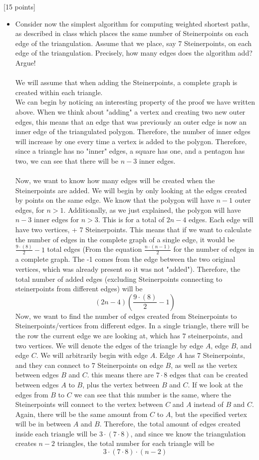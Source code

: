 \documentclass[12pt]{article}
\newcounter{ques}
\newenvironment{question}{\stepcounter{ques}{\noindent\bf Question \arabic{ques}:}}{\vspace{5mm}}
\begin{document}
\begin{question}[15 points]
\begin{itemize}
	\item Consider now the simplest algorithm for computing weighted shortest paths, as described in class which places the same number of Steinerpoints on each edge of the triangulation.   Assume that we place, say 7 Steinerpoints,  on each edge of the triangulation. Precisely, how many edges does the algorithm add? Argue!\\\\
  We will assume that when adding the Steinerpoints, a complete graph is created within each triangle.\\
  We can begin by noticing an interesting property of the proof we have written above. When we think about "adding" a vertex and creating two new outer edges, this means that an edge that was previously an outer edge is now an inner edge of the triangulated polygon. Therefore, the number of inner edges will increase by one every time a vertex is added to the polygon. Therefore, since a triangle has no "inner" edges, a square has one, and a pentagon has two, we can see that there will be $n-3$ inner edges.\\\\
  Now, we want to know how many edges will be created when the Steinerpoints are added. We will begin by only looking at the edges created by points on the same edge. We know that the polygon will have $n-1$ outer edges, for $n>1$. Additionally, as we just explained, the polygon will have $n-3$ inner edges for $n>3$. This is for a total of $2n-4$ edges. Each edge will have two vertices, + 7 Steinerpoints. This means that if we want to calculate the number of edges in the complete graph of a single edge, it would be $\frac{9\cdot(8)}{2}-1$ total edges (From the equation $\frac{n\cdot(n-1)}{2}$ for the number of edges in a complete graph. The -1 comes from the edge between the two original vertices, which was already present so it was not "added"). Therefore, the total number of added edges (excluding Steinerpoints connecting to steinerpoints from different edges) will be
  $$(2n-4)\left(\frac{9\cdot(8)}{2}-1\right)$$
  Now, we want to find the number of edges created from Steinerpoints to Steinerpoints/vertices from different edges. In a single triangle, there will be the row the current edge we are looking at, which has $7$ steinerpoints, and two vertices. We will denote the edges of the triangle by edge $A$, edge $B$, and edge $C$. We will arbitrarily begin with edge $A$. Edge $A$ has 7 Steinerpoints, and they can connect to $7$ Steinerpoints on edge $B$, as well as the vertex between edges $B$ and $C$. this means there are $7\cdot8$ edges that can be created between edges $A$ to $B$, plus the vertex between $B$ and $C$. If we look at the edges from $B$ to $C$ we can see that this number is the same, where the Steinerpoints will connect to the vertex between $C$ and $A$ instead of $B$ and $C$. Again, there will be the same amount from $C$ to $A$, but the specified vertex will be in between $A$ and $B$. Therefore, the total amount of edges created inside each triangle will be $3\cdot(7\cdot8)$, and since we know the triangulation creates $n-2$ triangles, the total number for each triangle will be $$3\cdot(7\cdot8)\cdot(n-2)$$

\end{itemize}
\end{question}
\end{document}

